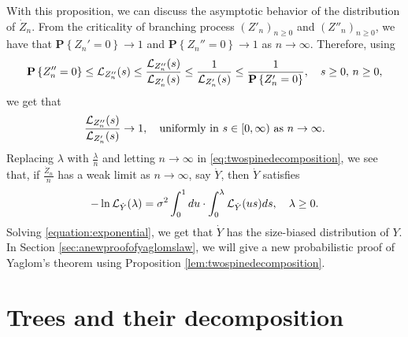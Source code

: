 \documentclass[12pt]{amsart}
\numberwithin{equation}{section}
\newcommand{\prob}{\mathbf P}
\newcommand{\set}[1]{\left\{ #1 \right\}}
\newcommand{\uniformly}{\text{uniformly in }}
\begin{document}
\par
	With this proposition, we can discuss the asymptotic behavior of the distribution of $\dot Z_n$.
	From the criticality of branching process $(Z'_n)_{n\ge 0}$ and $(Z''_n)_{n\ge 0}$, we have that $\prob\set{Z_n'=0}\to 1$ and $\prob\set{Z_n''=0}\to 1$ as $n\to\infty$.
	Therefore, using
\begin{equation*}
		\prob\set{Z_n''=0}
	\leq
		\cL_{Z_n''}(s)
	\leq
		\frac{\cL_{Z_n''}(s)}{\cL_{Z_n'}(s)}
	\leq
		\frac{1}{\cL_{Z_n'}(s)}
	\leq
		\frac{1}{\prob \set{Z_n'=0}},
	\quad
		s\geq 0,\, n\ge 0,
\end{equation*}
	we get that
\begin{equation}
\label{eq:uniformly}
	    \frac{\cL_{Z_n''}(s)}{\cL_{Z_n'}(s)}
	\to
	    1,
	\quad
				\uniformly s\in [0,\infty)\text{ as } n\to\infty.
\end{equation}
	Replacing $\lambda$ with $\frac{\lambda}{n}$ and letting $n\to\infty$ in \eqref{eq:twospinedecomposition},
    we see that, if $\frac{\dot Z_n}{n}$ has a weak limit as $n\to\infty$, say $\dot Y$, then $\dot Y$ satisfies
\begin{equation}
\label{equation:exponential}
		-\ln \mathcal L_{\dot Y}(\lambda)
	=
		\sigma^2\int_0^1du\cdot\int_0^\lambda \mathcal L_{\dot Y}(us)ds,
	\quad\lambda \geq 0.
\end{equation}
	Solving \eqref{equation:exponential}, we get that $\dot Y$ has the size-biased distribution of $Y$.
	In Section \ref{sec:anewproofofyaglomslaw}, we will give a new probabilistic proof of Yaglom's theorem using Proposition \ref{lem:twospinedecomposition}.
\section{Trees and their decomposition}
\label{sec:preliminary}
\end{document}
